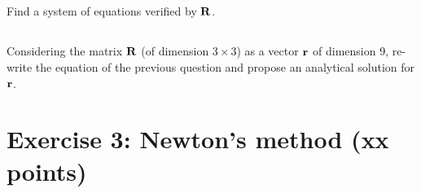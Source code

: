 \subsection{} Find a system of equations verified by ${\bf R}$.

\subsection{} Considering the  matrix ${\bf R}$ (of dimension $3 \times 3$) as a vector ${\bf r}$ of dimension 9, re-write the equation of the previous question and propose an analytical solution for ${\bf r}$.

\section*{Exercise 3: Newton's method \normalsize \textnormal(xx points)}

\subsection{} 
